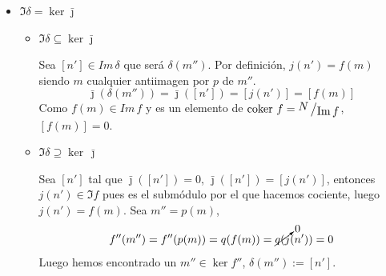 \begin{dem}
\begin{itemize}
\begin{itemize}
\end{itemize}
\item $\Im \delta = \ker  \bar \jmath$
\begin{itemize}
    \item $\Im \delta \subseteq \ker  \bar \jmath$

Sea $[n'] \in Im\, \delta$ que ser\'a $\delta(m'')$. Por definici\'on, $j(n') = f(m)$ siendo $m$ cualquier antiimagen por $p$ de $m''$. 
$$\bar \jmath (\delta(m'')) = \bar \jmath ([n']) = [j(n')] = [f(m)]$$
Como $f(m) \in Im\, f$ y es un elemento de $\coker\, f = \modulo{N}{\Im f}$, $[f(m)]=0$.

\item $\Im \delta \supseteq \ker\, \bar \jmath$

Sea $[n']$ tal que $\bar \jmath ([n']) = 0$, $\bar \jmath ([n']) = [j(n')]$, entonces $j(n') \in \Im f$ pues es el subm\'odulo por el que hacemos cociente, luego $j(n')=f(m)$. Sea $m''=p(m)$, 
$$f''(m'') = f''(p(m)) = q(f(m)) = \cancelto{0}{q(j}(n')) = 0$$
Luego hemos encontrado un $m'' \in \ker  f''$, $\delta(m'') := [n']$.
\end{itemize}
\end{itemize}    
\end{dem}
